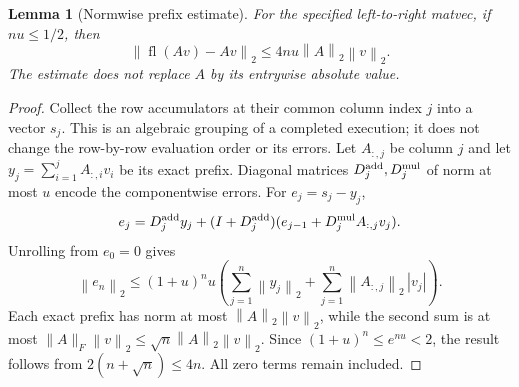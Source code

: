 \documentclass[11pt]{article}
\newtheorem{lemma}[theorem]{Lemma}
\theoremstyle{remark}\newtheorem{remark}[theorem]{Remark}
\newcommand{\norm}[1]{\left\lVert#1\right\rVert_2}
\newcommand{\fl}{\operatorname{fl}}
\begin{document}
\begin{lemma}[Normwise prefix estimate]\label{lem:prefix}
For the specified left-to-right matvec, if $nu\le1/2$, then
\begin{equation}\label{eq:prefixbound}
\norm{\fl(Av)-Av}\le4nu\norm A\norm v.
\end{equation}
The estimate does not replace $A$ by its entrywise absolute value.
\end{lemma}
\begin{proof}
Collect the row accumulators at their common column index $j$ into a
vector $s_j$. This is an algebraic grouping of a completed execution;
it does not change the row-by-row evaluation order or its errors.
Let $A_{:,j}$ be column $j$ and let
$y_j=\sum_{i=1}^j A_{:,i}v_i$ be its exact prefix. Diagonal matrices
$D_j^{\rm add},D_j^{\rm mul}$ of norm at most $u$ encode the componentwise
errors. For $e_j=s_j-y_j$,
\[
e_j=D_j^{\rm add}y_j+
(I+D_j^{\rm add})(e_{j-1}+D_j^{\rm mul}A_{:,j}v_j).
\]
Unrolling from $e_0=0$ gives
\[
\norm{e_n}\le(1+u)^n u\left(
\sum_{j=1}^n\norm{y_j}+\sum_{j=1}^n\norm{A_{:,j}}\,|v_j|\right).
\]
Each exact prefix has norm at most $\norm A\norm v$, while the second
sum is at most $\lVert A\rVert_F\norm v\le\sqrt n\norm A\norm v$.
Since $(1+u)^n\le e^{nu}<2$, the result follows from
$2(n+\sqrt n)\le4n$. All zero terms remain included.
\end{proof}
\end{document}
